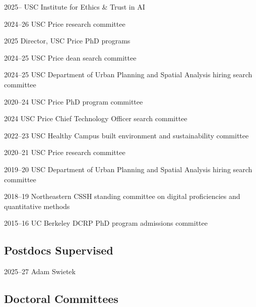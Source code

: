 \documentclass[11pt,letterpaper]{report} %
\begin{document}
\begin{tablist}
\item[2025--]   \tab{}USC Institute for Ethics \& Trust in AI
\item[2024--26] \tab{}USC Price research committee
\item[2025]     \tab{}Director, USC Price PhD programs
\item[2024--25] \tab{}USC Price dean search committee
\item[2024--25] \tab{}USC Department of Urban Planning and Spatial Analysis hiring search committee
\item[2020--24] \tab{}USC Price PhD program committee
\item[2024]     \tab{}USC Price Chief Technology Officer search committee
\item[2022--23] \tab{}USC Healthy Campus built environment and sustainability committee
\item[2020--21] \tab{}USC Price research committee
\item[2019--20] \tab{}USC Department of Urban Planning and Spatial Analysis hiring search committee
\item[2018--19] \tab{}Northeastern CSSH standing committee on digital proficiencies and quantitative methods
\item[2015--16] \tab{}UC Berkeley DCRP PhD program admissions committee

\end{tablist}

\subsection*{Postdocs Supervised}

\begin{tablist}

\item[2025--27] \tab{}Adam Swietek

\end{tablist}

\subsection*{Doctoral Committees}
\end{document}
